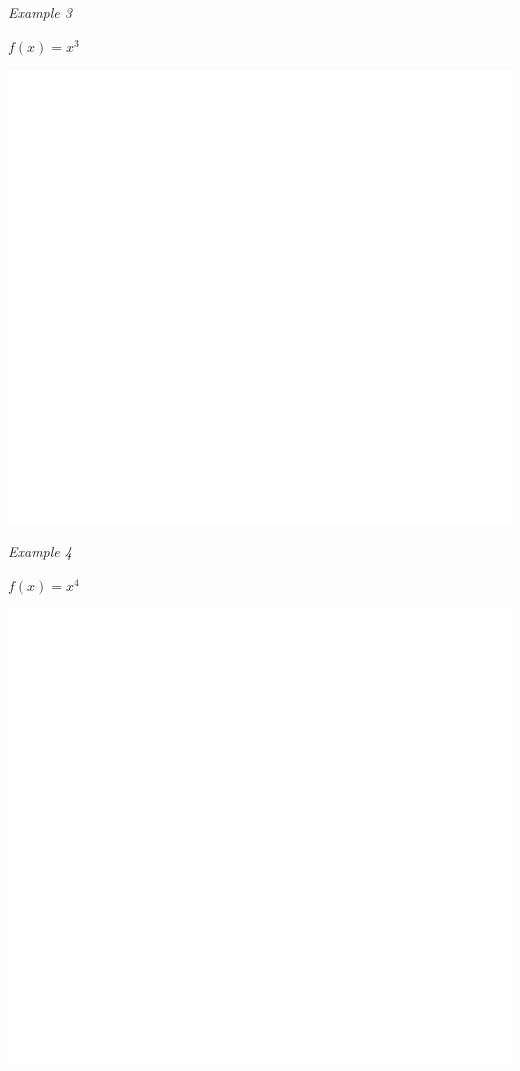\documentclass[]{book}
\begin{document}
\newpage

\emph{Example 3}

\(f(x)=x^3\)

\begin{center}\includegraphics[width=1\linewidth]{figure/LB5-1} \end{center}

\newpage

\emph{Example 4}

\(f(x)=x^4\)

\begin{center}\includegraphics[width=1\linewidth]{figure/LB6-1} \end{center}
\end{document}
